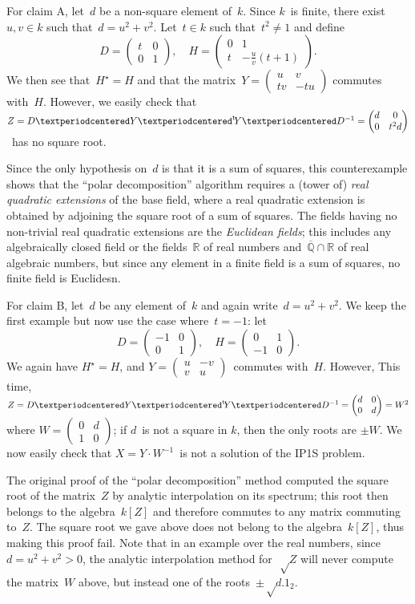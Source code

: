 \documentclass{article}%
\def\transpose#1{{\vphantom{#1}}^{\mathrm{t}}\!#1}
\def\mat#1{\begin{pmatrix}#1\end{pmatrix}}
\begin{document}
\medskip

For claim A, let~$d$ be a non-square element of~$k$.
Since $k$~is finite, there exist~$u, v ∈ k$ such that~$d = u^2 + v^2$.
Let~$t ∈ k$ such that~$t^2 ≠ 1$ and define
\[ D = \mat{t & 0 \\ 0 & 1}, \quad
H = \mat{0 & 1 \\ t & -\frac{u}{v}(t+1)}. \]
We then see that~$H^{⋆} = H$ and that
the matrix~$Y = \mat{u & v \\ t v & -t u}$ commutes with~$H$.
However, we easily check that
$Z = D · Y · \transpose{Y} · D^{-1} = \mat{d & 0 \\ 0 & t^2 d}$~has no square
root.

Since the only hypothesis on~$d$ is that it is a sum of squares,
this counterexample shows that the “polar decomposition” algorithm
requires a (tower of) \emph{real quadratic extensions} of the base field,
where a real quadratic extension is obtained by adjoining
the square root of a sum of squares.
The fields having no non-trivial real quadratic extensions
are the \emph{Euclidean fields};
this includes any algebraically closed field
or the fields~$ℝ$ of real numbers
and~$\overline{ℚ} ∩ ℝ$ of real algebraic numbers,
but since any element in a finite field is a sum of squares,
no finite field is Euclidesn.

\medskip

For claim B, let~$d$ be any element of~$k$ and again write~$d = u^2 + v^2$.
We keep the first example but now use the case where~$t = -1$: let
\[ D = \mat{-1 & 0 \\ 0 & 1}, \quad
H = \mat{0 & 1 \\ -1 & 0}. \]
We again have $H^{⋆} = H$, and $Y = \mat{u & -v\\v & u}$~commutes
with~$H$. However, This time,
$Z = D · Y · \transpose{Y} · D^{-1} = \mat{d & 0 \\ 0 & d} = W^2$
where $W = \mat{0 & d \\ 1 & 0}$;
if $d$~is not a square in $k$, then the only roots are $± W$.
We now easily check that
$X = Y · W^{-1}$~is not a solution of the IP1S problem.

The original proof of the “polar decomposition” method computed the
square root of the matrix~$Z$ by analytic interpolation on its spectrum;
this root then belongs to the algebra~$k[Z]$
and therefore commutes to any matrix commuting to~$Z$.
The square root we gave above does not belong to the algebra~$k[Z]$,
thus making this proof fail.
Note that in an example over the real numbers, since $d = u^2 + v^2 > 0$,
the analytic interpolation method for~$√Z$ will never compute
the matrix~$W$ above, but instead one of the roots~$±√{d}.1_{2}$.
\end{document}
